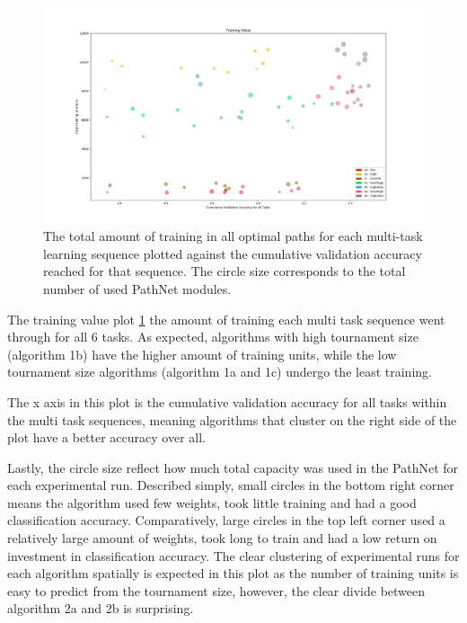 \begin{figure}[p!]%
    \includegraphics[width=\textwidth]{Chapters/Experiments/search_algo/figures/Training_value.png}
    \caption{The total amount of training in all optimal paths for each multi-task learning sequence plotted against the cumulative validation accuracy reached for that sequence. The circle size corresponds to the total number of used PathNet modules.}
    \label{fig:search.training_value}
\end{figure}

The training value plot \ref{fig:search.training_value} the amount of training each multi task sequence went through for all 6 tasks. As expected, algorithms with high tournament size (algorithm 1b) have the higher amount of training units, while the low tournament size algorithms (algorithm 1a and 1c) undergo the least training.

The x axis in this plot is the cumulative validation accuracy for all tasks within the multi task sequences, meaning algorithms that cluster on the right side of the plot have a better accuracy over all. 

Lastly, the circle size reflect how much total capacity was used in the PathNet for each experimental run. Described simply, small circles in the bottom right corner means the algorithm used few weights, took little training and had a good classification accuracy. Comparatively, large circles in the top left corner used a relatively large amount of weights, took long to train and had a low return on investment in classification accuracy. The clear clustering of experimental runs for each algorithm spatially is expected in this plot as the number of training units is easy to predict from the tournament size, however, the clear divide between algorithm 2a and 2b is surprising.

